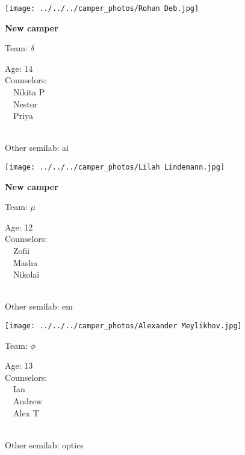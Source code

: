 \documentclass[10pt,letterpaper, landscape]{article}
\begin{document}
\verticalshiftfornextsticker
\renewcommand{\baselinestretch}{1} \begin{sticker}
\noindent\begin{minipage}{0.5\textwidth}\texttt{[image: ../../../camper\_photos/Rohan Deb.jpg]}\end{minipage}\begin{minipage}{0.45\textwidth}
\textbf{New camper} 

Team: {\Large $\delta$}

Age:        14\\
Counselors: \\\ \ Nikita P\\\ \ Nestor\\\ \ Priya\\
\end{minipage} \\ \vspace{0.07in}
Other semilab: ai
\end{sticker}
\horizontalshiftfornextsticker
\renewcommand{\baselinestretch}{1} \begin{sticker}
\noindent\begin{minipage}{0.5\textwidth}\texttt{[image: ../../../camper\_photos/Lilah Lindemann.jpg]}\end{minipage}\begin{minipage}{0.45\textwidth}
\textbf{New camper} 

Team: {\Large $\mu$}

Age:        12\\
Counselors: \\\ \ Zofii\\\ \ Masha\\\ \ Nikolai\\
\end{minipage} \\ \vspace{0.07in}
Other semilab: em
\end{sticker}
\horizontalshiftfornextsticker
\renewcommand{\baselinestretch}{1} \begin{sticker}
\noindent\begin{minipage}{0.5\textwidth}\texttt{[image: ../../../camper\_photos/Alexander Meylikhov.jpg]}\end{minipage}\begin{minipage}{0.45\textwidth}
Team: {\Large $\phi$}

Age:        13\\
Counselors: \\\ \ Ian\\\ \ Andrew\\\ \ Alex T\\
\end{minipage} \\ \vspace{0.07in}
Other semilab: optics
\end{sticker}
\end{document}
